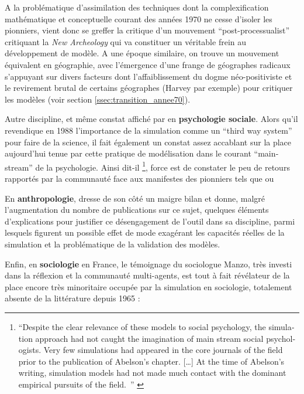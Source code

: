 A la problématique d'assimilation des techniques dont la complexification mathématique et conceptuelle courant des années 1970 ne cesse d'isoler les pionniers, vient donc se greffer la critique d'un mouvement \foreignquote{english}{post-processualist} critiquant la \textit{New Archeology} qui va constituer un véritable frein au développement de modèle. A une époque similaire, on trouve un mouvement équivalent en géographie, avec l'émergence d'une frange de géographes radicaux s'appuyant sur divers facteurs dont l'affaiblissement du dogme néo-positiviste et le revirement brutal de certains géographes (Harvey par exemple) pour critiquer les modèles (voir section \ref{ssec:transition_annee70}).

\medskip
Autre discipline, et même constat affiché par \textcite{Ostrom1988} en \textbf{psychologie sociale}. Alors qu'il revendique en 1988 l'importance de la simulation comme un \foreignquote{english}{third way system} pour faire de la science, il fait également un constat assez accablant sur la place aujourd'hui tenue par cette pratique de modélisation dans le courant \foreignquote{english}{mainstream} de la psychologie. Ainsi dit-il \footnote{ \foreignquote{english}{Despite the clear relevance of these models to  social psychology, the simulation approach had not caught the imagination of main stream social psychologists. Very few simulations had appeared in the core journals of the field prior to the publication of Abelson's chapter. […] At the time of Abelson's writing, simulation models had not made much contact with the dominant empirical pursuits of the field. } \autocite[382]{Ostrom1988}}, force est de constater le peu de retours rapportés par la communauté face aux manifestes des pionniers tels que \textcite{Gullahorn1965} ou \textcite{Abelson1968}

\medskip

En \textbf{anthropologie}, \textcite{Dyke1981} dresse de son côté un maigre bilan et donne, malgré l'augmentation du nombre de publications sur ce sujet, quelques éléments d'explications pour justifier ce désengagement de l'outil dans sa discipline, parmi lesquels figurent un possible effet de mode exagérant les capacités réelles de la simulation et la problématique de la validation des modèles. 

\medskip
Enfin, en \textbf{sociologie} en France, le témoignage du sociologue Manzo, très investi dans la réflexion et la communauté multi-agents, est tout à fait révélateur de la place encore très minoritaire occupée par la simulation en sociologie, totalement absente de la littérature depuis 1965 :

